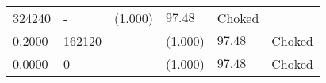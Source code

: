 \begin{longtable}[]{@{}llllll@{}}
\begin{minipage}[t]{0.05\columnwidth}
324240\strut
\end{minipage} & \begin{minipage}[t]{0.21\columnwidth}\raggedright
-\strut
\end{minipage} & \begin{minipage}[t]{0.04\columnwidth}\raggedright
(1.000)\strut
\end{minipage} & \begin{minipage}[t]{0.44\columnwidth}\raggedright
\(97.48\)\strut
\end{minipage} & \begin{minipage}[t]{0.05\columnwidth}\raggedright
Choked\strut
\end{minipage}\tabularnewline
\begin{minipage}[t]{0.05\columnwidth}\raggedright
0.2000\strut
\end{minipage} & \begin{minipage}[t]{0.05\columnwidth}\raggedright
162120\strut
\end{minipage} & \begin{minipage}[t]{0.21\columnwidth}\raggedright
-\strut
\end{minipage} & \begin{minipage}[t]{0.04\columnwidth}\raggedright
(1.000)\strut
\end{minipage} & \begin{minipage}[t]{0.44\columnwidth}\raggedright
\(97.48\)\strut
\end{minipage} & \begin{minipage}[t]{0.05\columnwidth}\raggedright
Choked\strut
\end{minipage}\tabularnewline
\begin{minipage}[t]{0.05\columnwidth}\raggedright
0.0000\strut
\end{minipage} & \begin{minipage}[t]{0.05\columnwidth}\raggedright
0\strut
\end{minipage} & \begin{minipage}[t]{0.21\columnwidth}\raggedright
-\strut
\end{minipage} & \begin{minipage}[t]{0.04\columnwidth}\raggedright
(1.000)\strut
\end{minipage} & \begin{minipage}[t]{0.44\columnwidth}\raggedright
\(97.48\)\strut
\end{minipage} & \begin{minipage}[t]{0.05\columnwidth}\raggedright
Choked\strut
\end{minipage}\tabularnewline
\bottomrule
\end{longtable}

